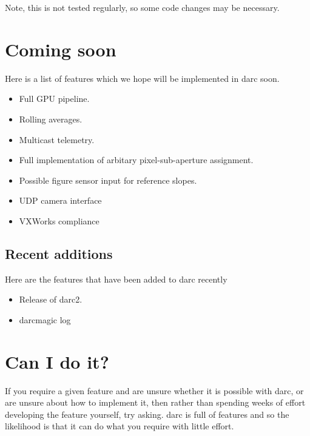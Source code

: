 \documentclass[a4,10pt]{article}
\begin{document}
Note, this is not tested regularly, so some code changes may
be necessary.

\section{Coming soon}
Here is a list of features which we hope will be implemented in darc
soon.

\begin{itemize}
\item Full GPU pipeline.
\item Rolling averages.
\item Multicast telemetry.
\item Full implementation of arbitary pixel-sub-aperture assignment.
\item Possible figure sensor input for reference slopes.
\item UDP camera interface
\item VXWorks compliance
\end{itemize}

\subsection{Recent additions}
Here are the features that have been added to darc recently
\begin{itemize}
\item Release of darc2.
\item darcmagic log
\end{itemize}

\section{Can I do it?}
If you require a given feature and are unsure whether it is possible
with darc, or are unsure about how to implement it, then rather than
spending weeks of effort developing the feature yourself, try asking.
darc is full of features and so the likelihood is that it can do what
you require with little effort.
\end{document}
